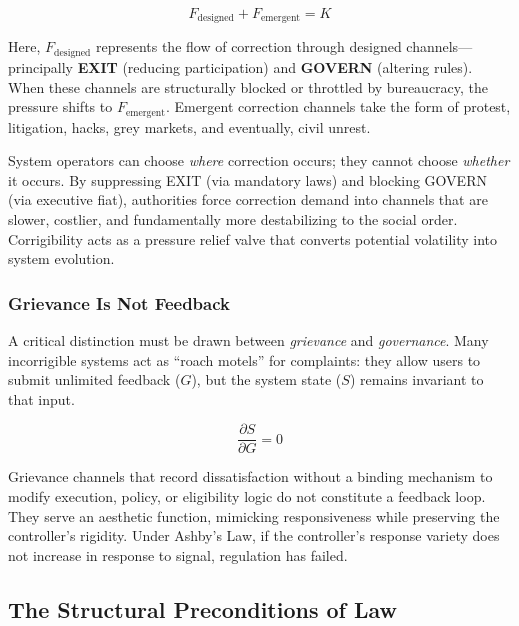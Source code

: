 \begin{equation}
F_{\text{designed}} + F_{\text{emergent}} = K
\label{eq:conservation}
\end{equation}

Here, $F_{\text{designed}}$ represents the flow of correction through designed channels---principally \textbf{EXIT} (reducing participation) and \textbf{GOVERN} (altering rules). When these channels are structurally blocked or throttled by bureaucracy, the pressure shifts to $F_{\text{emergent}}$. Emergent correction channels take the form of protest, litigation, hacks, grey markets, and eventually, civil unrest.

System operators can choose \textit{where} correction occurs; they cannot choose \textit{whether} it occurs. By suppressing EXIT (via mandatory laws) and blocking GOVERN (via executive fiat), authorities force correction demand into channels that are slower, costlier, and fundamentally more destabilizing to the social order. Corrigibility acts as a pressure relief valve that converts potential volatility into system evolution.

\subsubsection{Grievance Is Not Feedback}
\label{subsec:grievance}

A critical distinction must be drawn between \textit{grievance} and \textit{governance}. Many incorrigible systems act as ``roach motels'' for complaints: they allow users to submit unlimited feedback ($G$), but the system state ($S$) remains invariant to that input.

\begin{equation}
\frac{\partial S}{\partial G} = 0
\label{eq:grievance}
\end{equation}

Grievance channels that record dissatisfaction without a binding mechanism to modify execution, policy, or eligibility logic do not constitute a feedback loop. They serve an aesthetic function, mimicking responsiveness while preserving the controller's rigidity. Under Ashby's Law, if the controller's response variety does not increase in response to signal, regulation has failed.

\subsection{The Structural Preconditions of Law}

